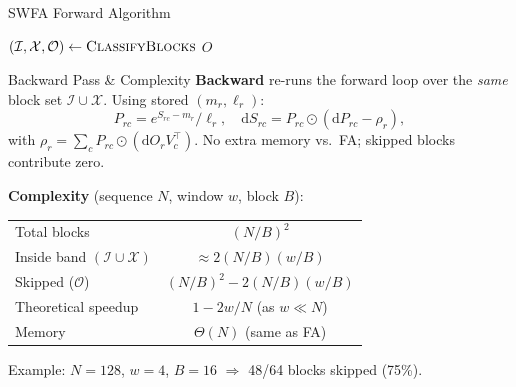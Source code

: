\documentclass[10pt,aspectratio=169]{beamer}
\begin{document}
\begin{frame}{SWFA Forward Algorithm}
  \scriptsize
  \begin{algorithm}[H]
    \SetAlgoLined
    $(\mathcal{I},\mathcal{X},\mathcal{O}) \leftarrow \textsc{ClassifyBlocks}$\;
    \Return $O$
  \end{algorithm}
\end{frame}

\begin{frame}{Backward Pass \& Complexity}
  \textbf{Backward} re-runs the forward loop over the \emph{same}
  block set $\mathcal{I}\cup\mathcal{X}$. Using stored $(m_r,\ell_r)$:
  \[
     P_{rc} = e^{S_{rc} - m_r}/\ell_r,\quad
     \mathrm{d}S_{rc} = P_{rc}\odot(\mathrm{d}P_{rc} - \rho_r),
  \]
  with $\rho_r = \sum_c P_{rc}\odot(\mathrm{d}O_r V_c^{\!\top})$. No
  extra memory vs.\ FA; skipped blocks contribute zero.

  \vspace{1.5ex}
  \textbf{Complexity} (sequence $N$, window $w$, block $B$):
  \begin{center}
  \begin{tabular}{@{}lc@{}}
    \toprule
    Total blocks             & $(N/B)^2$\\
    Inside band $(\mathcal{I} \cup \mathcal{X})$  & $\approx 2(N/B)(w/B)$\\
    Skipped ($\mathcal{O}$) & $(N/B)^2 - 2(N/B)(w/B)$\\
    \alert{Theoretical speedup} & $1 - 2w/N$ (as $w \ll N$)\\
    Memory & $\Theta(N)$ (same as FA)\\
    \bottomrule
  \end{tabular}
  \end{center}
  Example: $N{=}128$, $w{=}4$, $B{=}16$ $\Rightarrow$ 48/64 blocks
  skipped (75\%).
\end{frame}
\end{document}
